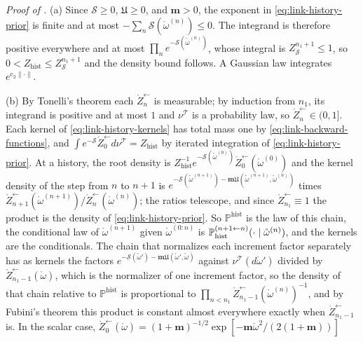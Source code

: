 \noindent\emph{Proof of .}
(a) Since $\mathscr S\geq0$, $\mathfrak U\geq0$, and $\mathbf m>0$, the exponent in
\eqref{eq:link-history-prior} is finite and at most $-\sum_n\mathscr S(\mathring\omega^{(n)})\leq0$.
The integrand is therefore positive everywhere and at most
$\prod_ne^{-\mathscr S(\mathring\omega^{(n)})}$, whose integral is $Z_{\mathscr S}^{n_1+1}\leq1$, so
$0<Z_{\mathrm{hist}}\leq Z_{\mathscr S}^{n_1+1}$ and the density bound follows. A Gaussian law
integrates $e^{\mathrm c_2\lVert\cdot\rVert}$.

(b) By Tonelli's theorem each $\mathring Z^{\leftarrow}_n$ is measurable; by induction from $n_1$, its integrand is
positive and at most $1$ and $\nu^{\mathscr T}$ is a probability law, so $\mathring Z^{\leftarrow}_n\in(0,1]$. Each
kernel of \eqref{eq:link-history-kernels} has total mass one by \eqref{eq:link-backward-functions},
and $\int e^{-\mathscr S}\mathring Z^{\leftarrow}_0d\nu^{\mathscr T}=Z_{\mathrm{hist}}$ by iterated integration of
\eqref{eq:link-history-prior}. At a history, the root density is
$Z_{\mathrm{hist}}^{-1}e^{-\mathscr S(\mathring\omega^{(0)})}\mathring Z^{\leftarrow}_0(\mathring\omega^{(0)})$ and
the kernel density of the step from $n$ to $n+1$ is
$e^{-\mathscr S(\mathring\omega^{(n+1)})-\mathbf m\mathfrak U(\mathring\omega^{(n+1)},\mathring\omega^{(n)})}$ times
$\mathring Z^{\leftarrow}_{n+1}(\mathring\omega^{(n+1)})/\mathring Z^{\leftarrow}_n(\mathring\omega^{(n)})$; the
ratios telescope, and since $\mathring Z^{\leftarrow}_{n_1}\equiv1$ the product is the density of
\eqref{eq:link-history-prior}.
So $\mathbb P^{\mathrm{hist}}$ is the law of this chain, the conditional law of
$\mathring\omega^{(n+1)}$ given $\mathring\omega^{(0:n)}$ is
$\mathbb P^{(n+1\leftarrow n)}_{\mathrm{hist}}(\cdot\mid\mathring\omega^{(n)})$, and the kernels are the conditionals.
The chain that normalizes each increment factor separately has as kernels the factors
$e^{-\mathscr S(\mathring\omega')-\mathbf m\mathfrak U(\mathring\omega',\mathring\omega)}$ against
$\nu^{\mathscr T}(d\mathring\omega')$ divided by $\mathring Z^{\leftarrow}_{n_1-1}(\mathring\omega)$, which is
the normalizer of one increment factor, so the density of that chain relative to
$\mathbb P^{\mathrm{hist}}$ is proportional to
$\prod_{n<n_1}\mathring Z^{\leftarrow}_{n_1-1}(\mathring\omega^{(n)})^{-1}$, and by Fubini's theorem this product is
constant almost everywhere exactly when $\mathring Z^{\leftarrow}_{n_1-1}$ is. In the scalar case,
$\mathring Z^{\leftarrow}_0(\mathring\omega)=(1+\mathbf m)^{-1/2}\exp[-\mathbf m\mathring\omega^2/(2(1+\mathbf m))]$
